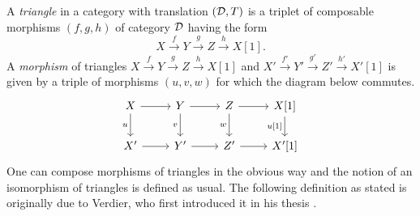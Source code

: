 A \emph{triangle} in a category with translation $(\mathcal D, T)$ is a triplet of composable morphisms $(f, g, h)$ of category $\mathcal D$ having the form 
\[
    X\xrightarrow{\ f \ } Y \xrightarrow{\ g \ } Z \xrightarrow{\ h \ } X[1].
\]
A \emph{morphism} of triangles $X\xrightarrow{f} Y \xrightarrow{g} Z \xrightarrow{h} X[1]$ and $X'\xrightarrow{f'} Y' \xrightarrow{g'} Z' \xrightarrow{h'} X'[1]$ is given by a triple of morphisms $(u, v, w)$ for which the diagram below commutes.
\[
\begin{tikzcd}
	X & Y & Z & {X[1]} \\
	{X'} & {Y'} & {Z'} & {X'[1]}
	\arrow[from=1-1, to=1-2]
	\arrow["u"', from=1-1, to=2-1]
	\arrow[from=1-2, to=1-3]
	\arrow["v"', from=1-2, to=2-2]
	\arrow[from=1-3, to=1-4]
	\arrow["w"', from=1-3, to=2-3]
	\arrow["{u[1]}"', from=1-4, to=2-4]
	\arrow[from=2-1, to=2-2]
	\arrow[from=2-2, to=2-3]
	\arrow[from=2-3, to=2-4]
\end{tikzcd}
\]
One can compose morphisms of triangles in the obvious way and the notion of an isomorphism of triangles is defined as usual. The following definition as stated is originally due to Verdier, who first introduced it in his thesis \cite{Verdier}.

